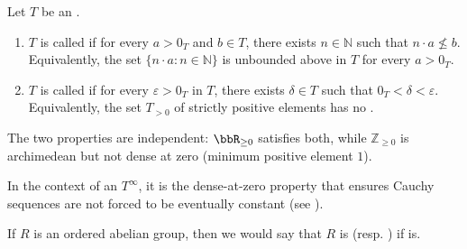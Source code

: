 \begin{definition} \label{definition:archimedean_ordered_monoid_dense_at_zero_ordered_monoid}
    Let $T$ be an .

    \begin{enumerate}
        \item $T$ is called  if for every $a > 0_T$ and $b \in T$, there exists $n \in \mathbb{N}$ such that $n \cdot a \not\le b$. Equivalently, the set $\{n \cdot a : n \in \mathbb{N}\}$ is unbounded above in $T$ for every $a > 0_T$.

        \item $T$ is called  if for every $\varepsilon > 0_T$ in $T$, there exists $\delta \in T$ such that $0_T < \delta < \varepsilon$. Equivalently, the set $T_{>0}$ of strictly positive elements has no .
    \end{enumerate}

    The two properties are independent: $\bbR_{\geq 0}$ satisfies both, while $\mathbb{Z}_{\geq 0}$ is archimedean but not dense at zero (minimum positive element $1$).

    In the context of  an  $T^\infty$, it is the dense-at-zero property that ensures Cauchy sequences are not forced to be eventually constant (see ).

    If $R$ is an ordered abelian group, then we would say that $R$ is  (resp. ) if  is. 
\end{definition}

